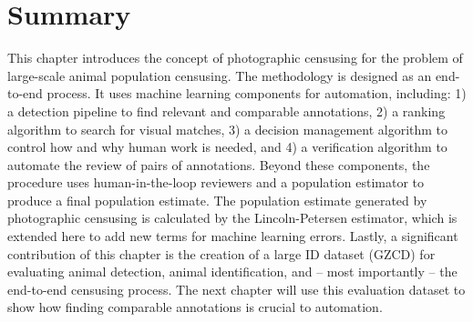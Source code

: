 \section{Summary}

This chapter introduces the concept of photographic censusing for the problem of large-scale animal population censusing.  The methodology is designed as an end-to-end process.  It uses machine learning components for automation, including: 1) a detection pipeline to find relevant and comparable annotations, 2) a ranking algorithm to search for visual matches, 3) a decision management algorithm to control how and why human work is needed, and 4) a verification algorithm to automate the review of pairs of annotations.  Beyond these components, the procedure uses human-in-the-loop reviewers and a population estimator to produce a final population estimate.  The population estimate generated by photographic censusing is calculated by the Lincoln-Petersen estimator, which is extended here to add new terms for machine learning errors.  Lastly, a significant contribution of this chapter is the creation of a large ID dataset (GZCD) for evaluating animal detection, animal identification, and -- most importantly -- the end-to-end censusing process.  The next chapter will use this evaluation dataset to show how finding comparable annotations is crucial to automation.
